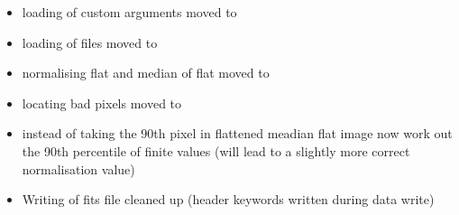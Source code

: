 \begin{itemize}
	\item loading of custom arguments moved to 

	\item loading of files moved to 

	\item normalising flat and median of flat moved to 

	\item locating bad pixels moved to 

	\item instead of taking the 90th pixel in flattened meadian flat image now work out the 90th percentile of finite values (will lead to a slightly more correct normalisation value)

	\item Writing of fits file cleaned up (header keywords written during data write)
\end{itemize}